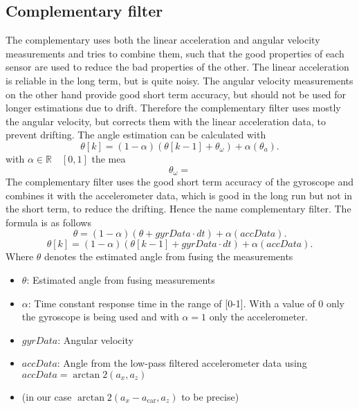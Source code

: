 \subsection{Complementary filter}
The complementary uses both the linear acceleration and angular velocity measurements and tries to combine them, such that the good properties of each sensor are used to reduce the bad properties of the other.
The linear acceleration is reliable in the long term, but is quite noisy.
The angular velocity measurements on the other hand provide good short term accuracy, but should not be used for longer estimations due to drift.
Therefore the complementary filter uses mostly the angular velocity, but corrects them with the linear acceleration data, to prevent drifting.
The angle estimation can be calculated with
\begin{equation}
    \theta[k] = (1-\alpha)(\theta[k-1] + \theta_\omega) + \alpha(\theta_a).
\end{equation}
with $\alpha \in \mathbb{R} \quad [0,1]$
the mea
\begin{equation}
    \theta_\omega =
\end{equation}
The complementary filter uses the good short term accuracy of the gyroscope and combines it with the accelerometer data, which is good in the long run but not in the short term, to reduce the drifting.
Hence the name complementary filter. The formula is as follows
\begin{equation}
    \theta = (1-\alpha)(\theta + gyrData\cdot dt) + \alpha(accData).
\end{equation}
\begin{equation}
    \theta[k] = (1-\alpha)(\theta[k-1] + gyrData\cdot dt) + \alpha(accData).
\end{equation}
Where $\theta$ denotes the estimated angle from fusing the measurements
\begin{itemize}
    \item $\theta$: Estimated angle from fusing measurements
    \item $\alpha$: Time constant response time in the range of [0-1]. With a value of 0 only the gyroscope is being used and with $\alpha=1$ only the accelerometer.
    \item $gyrData$: Angular velocity
    \item $accData$: Angle from the low-pass filtered accelerometer data using $accData = \arctan2(a_x, a_z)$
    \item (in our case $\arctan2(a_x-a_\mathrm{car}, a_z)$ to be precise)
\end{itemize}

